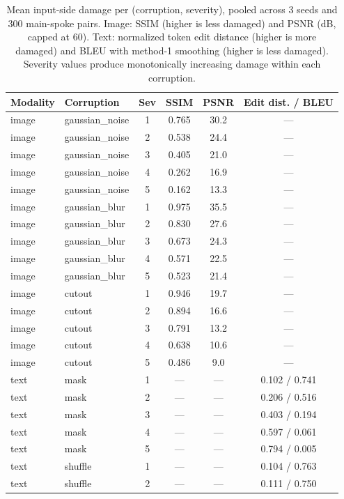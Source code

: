 \begin{table}[h]
\centering
\caption{Mean input-side damage per (corruption, severity), pooled across 3 seeds and 300 main-spoke pairs. Image: SSIM (higher is less damaged) and PSNR (dB, capped at 60). Text: normalized token edit distance (higher is more damaged) and BLEU with method-1 smoothing (higher is less damaged). Severity values produce monotonically increasing damage within each corruption.}
\label{tab:t6_damage}
\footnotesize
\begin{tabular}{llcccc}
\toprule
Modality & Corruption & Sev & SSIM & PSNR & Edit dist. / BLEU \\
\midrule
image & gaussian_noise & 1 & 0.765 & 30.2 & ---  \\
image & gaussian_noise & 2 & 0.538 & 24.4 & ---  \\
image & gaussian_noise & 3 & 0.405 & 21.0 & ---  \\
image & gaussian_noise & 4 & 0.262 & 16.9 & ---  \\
image & gaussian_noise & 5 & 0.162 & 13.3 & ---  \\
image & gaussian_blur & 1 & 0.975 & 35.5 & ---  \\
image & gaussian_blur & 2 & 0.830 & 27.6 & ---  \\
image & gaussian_blur & 3 & 0.673 & 24.3 & ---  \\
image & gaussian_blur & 4 & 0.571 & 22.5 & ---  \\
image & gaussian_blur & 5 & 0.523 & 21.4 & ---  \\
image & cutout & 1 & 0.946 & 19.7 & ---  \\
image & cutout & 2 & 0.894 & 16.6 & ---  \\
image & cutout & 3 & 0.791 & 13.2 & ---  \\
image & cutout & 4 & 0.638 & 10.6 & ---  \\
image & cutout & 5 & 0.486 & 9.0 & ---  \\
text & mask & 1 & --- & --- & 0.102 / 0.741 \\
text & mask & 2 & --- & --- & 0.206 / 0.516 \\
text & mask & 3 & --- & --- & 0.403 / 0.194 \\
text & mask & 4 & --- & --- & 0.597 / 0.061 \\
text & mask & 5 & --- & --- & 0.794 / 0.005 \\
text & shuffle & 1 & --- & --- & 0.104 / 0.763 \\
text & shuffle & 2 & --- & --- & 0.111 / 0.750 \\

\end{tabular}
\end{table}
